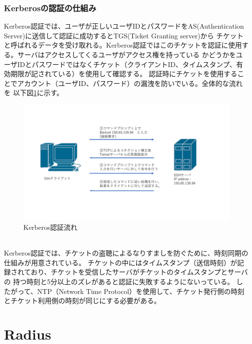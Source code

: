 \documentclass[12pt,a4paper,titlepage]{jreport}
\begin{document}
\subsubsection*{Kerberosの認証の仕組み}
Kerberos認証では、ユーザが正しいユーザIDとパスワードをAS(Authentication Server)に送信して認証に成功するとTGS(Ticket Granting server)から
チケットと呼ばれるデータを受け取れる。Kerberos認証ではこのチケットを認証に使用する。サーバはアクセスしてくるユーザがアクセス権を持っている
かどうかをユーザIDとパスワードではなくチケット（クライアントID、タイムスタンプ、有効期限が記されている）を使用して確認する。
認証時にチケットを使用することでアカウント（ユーザID、パスワード）の漏洩を防いでいる。全体的な流れを
以下図\ref{KerberosAuthority}に示す。
\begin{figure}[h]
    \begin{flushleft}
        \includegraphics[width=1.0\textwidth, page=12]{graphs/network_archtecture.pdf}
        \caption{Kerberos認証流れ}
        \label{KerberosAuthority}
    \end{flushleft}
\end{figure}\\
Kerberos認証では、チケットの盗聴によるなりすましを防ぐために、時刻同期の仕組みが用意されている。
チケットの中にはタイムスタンプ（送信時刻）が記録されており、チケットを受信したサーバがチケットのタイムスタンプとサーバの
持つ時刻と5分以上のズレがあると認証に失敗するようにないっている。
したがって、NTP（Network Time Protocol）を使用して、チケット発行側の時刻とチケット利用側の時刻が同じにする必要がある。


\section{Radius}
\end{document}
